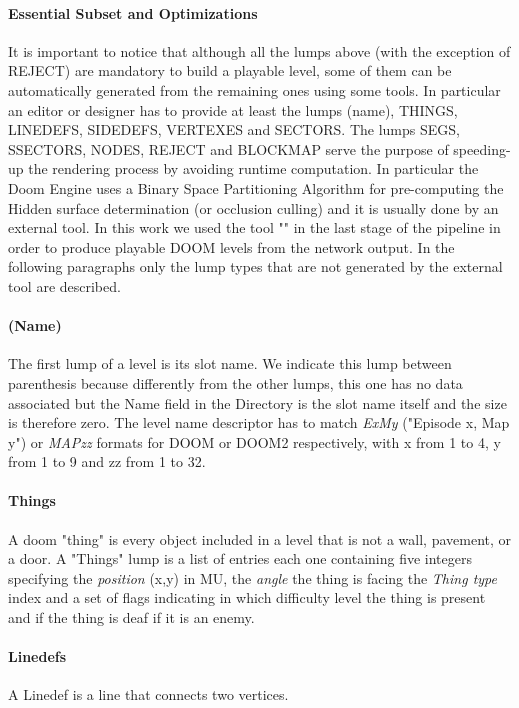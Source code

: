 \paragraph{Essential Subset and Optimizations} It is important to notice that although all the lumps above (with the exception of REJECT) are mandatory to build a playable level, some of them can be automatically generated from the remaining ones using some tools. In particular an editor or designer has to provide at least the lumps (name), THINGS, LINEDEFS, SIDEDEFS, VERTEXES and SECTORS. The lumps SEGS, SSECTORS, NODES, REJECT and BLOCKMAP serve the purpose of speeding-up the rendering process by avoiding runtime computation. In particular the Doom Engine uses a Binary Space Partitioning Algorithm \cite{Fuchs:1980:VSG:965105.807481} for pre-computing the Hidden surface determination (or occlusion culling) and it is usually done by an external tool. In this work we used the tool "" \cite{bsp} in the last stage of the pipeline in order to produce playable DOOM levels from the network output. In the following paragraphs only the lump types that are not generated by the external tool are described.

\paragraph{(Name)} The first lump of a level is its slot name. We indicate this lump between parenthesis because differently from the other lumps, this one has no data associated but the Name field in the Directory is the slot name itself and the size is therefore zero. The level name descriptor has to match \textit{ExMy} ("Episode x, Map y") or \textit{MAPzz} formats for DOOM or DOOM2 respectively, with x from 1 to 4, y from 1 to 9 and zz from 1 to 32.


\paragraph{Things} A doom "\gls{thing}" is every object included in a level that is not a wall, pavement, or a door. A "Things" lump is a list of entries each one containing five integers specifying the \textit{position} (x,y) in \gls{MU}, the \textit{angle} the thing is facing the \textit{Thing type} index and a set of flags indicating in which difficulty level the thing is present and if the thing is deaf if it is an enemy.

\paragraph{Linedefs} A Linedef is a line that connects two vertices. 
